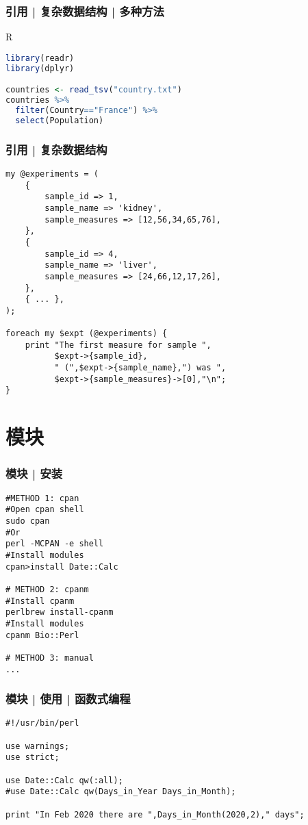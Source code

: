 \begin{frame}[fragile]
  \frametitle{引用 | 复杂数据结构 | 多种方法}
  \begin{block}{R}
  \vspace{-0.5em}
\begin{lstlisting}[language=r]
library(readr)
library(dplyr)

countries <- read_tsv("country.txt")
countries %>% 
  filter(Country=="France") %>% 
  select(Population)
\end{lstlisting}
  \end{block}
\end{frame}

\begin{frame}[fragile]
  \frametitle{引用 | 复杂数据结构}
  \vspace{-1.8em}
\begin{lstlisting}[basicstyle=\footnotesize\tt,numberstyle=\scriptsize]
my @experiments = (
    {
        sample_id => 1,
        sample_name => 'kidney',
        sample_measures => [12,56,34,65,76],
    },
    {
        sample_id => 4,
        sample_name => 'liver',
        sample_measures => [24,66,12,17,26],
    },
    { ... },
);

foreach my $expt (@experiments) {
    print "The first measure for sample ",
          $expt->{sample_id},
          " (",$expt->{sample_name},") was ",
          $expt->{sample_measures}->[0],"\n";
}
\end{lstlisting}
\end{frame}

\section{模块}
\begin{frame}[fragile]
  \frametitle{模块 | 安装}
  \vspace{-1.5em}
\begin{lstlisting}
#METHOD 1: cpan
#Open cpan shell
sudo cpan
#Or
perl -MCPAN -e shell
#Install modules
cpan>install Date::Calc

# METHOD 2: cpanm
#Install cpanm
perlbrew install-cpanm
#Install modules
cpanm Bio::Perl

# METHOD 3: manual
...
\end{lstlisting}
\end{frame}

\begin{frame}[fragile]
  \frametitle{模块 | 使用 | 函数式编程}
  \vspace{-1.5em}
\begin{lstlisting}
#!/usr/bin/perl

use warnings;
use strict;

use Date::Calc qw(:all);
#use Date::Calc qw(Days_in_Year Days_in_Month);

print "In Feb 2020 there are ",Days_in_Month(2020,2)," days";
\end{lstlisting}
\end{frame}

